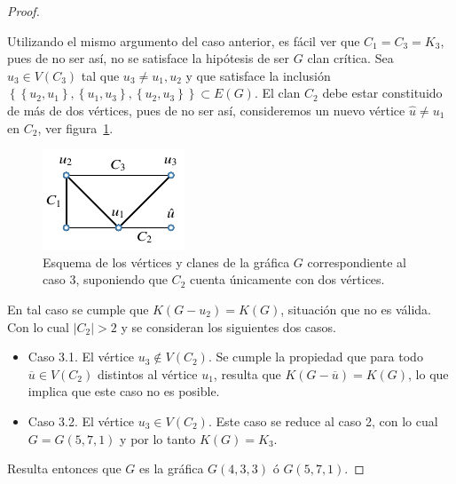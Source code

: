 \documentclass[12pt]{book}
\theoremstyle{definition}
\begin{document}
\begin{proof}
\begin{itemize}
Utilizando el mismo argumento del caso anterior, es fácil ver que $C_1= C_3=K_3$, pues de no ser así, no se satisface la hipótesis de ser $G$ clan crítica. Sea $u_3\in V(C_3)$ tal que $u_3\neq u_1,u_2$ y que satisface la inclusión $\left\{\left\{u_2,u_1\right\},\left\{u_1,u_3\right\},\left\{u_2,u_3\right\}\right\}\subset E(G)$. El clan $C_2$ debe estar constituido de más de dos vértices, pues de no ser así, consideremos un nuevo vértice $\hat{u}\neq u_1$ en $C_2$, ver figura~\ref{F4}.

\begin{figure}[!htbp]
	\centering
	\includegraphics[scale=1.2]{Fig4.pdf}
	\caption{Esquema de los vértices y clanes de la gráfica $G$ correspondiente al caso 3, suponiendo que $C_2$ cuenta únicamente con dos vértices.\label{F4}}
\end{figure}

En tal caso se cumple que $K(G-u_2)=K(G)$, situación que no es válida. Con lo cual $|C_2|>2$ y se consideran los siguientes dos casos.
\begin{itemize}
\item Caso 3.1.
El vértice $u_3\notin V(C_2)$. Se cumple la propiedad que para todo $\overline{u}\in V(C_2)$ distintos al vértice $u_1$, resulta que $K(G-\overline{u})=K(G)$, lo que implica que este caso no es posible.

\item Caso 3.2.
El vértice $u_3\in V(C_2)$. Este caso se reduce al caso 2, con lo cual $G=G(5,7,1)$ y por lo tanto $K(G)=K_3$.
\end{itemize}
\end{itemize}
Resulta entonces que $G$ es la gráfica $G(4,3,3)$ ó $G(5,7,1)$.
\end{proof}







\end{document}
